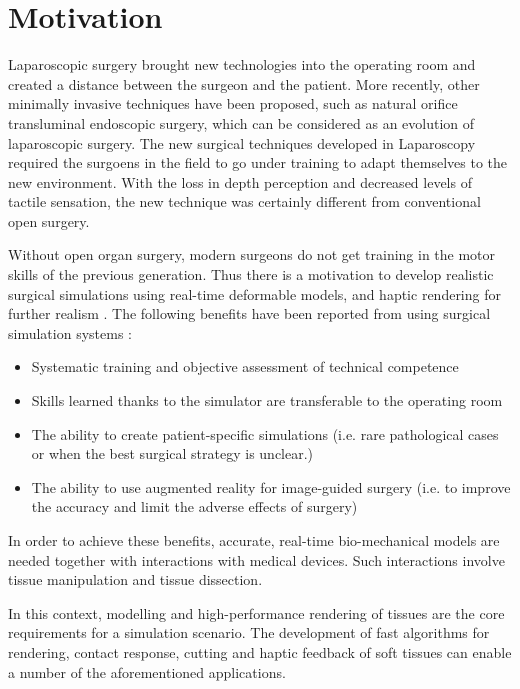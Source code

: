 \section{Motivation}

Laparoscopic surgery brought new technologies into the operating room and created a 
distance between the surgeon and the patient. More recently, other minimally invasive techniques have 
been proposed, such as natural orifice transluminal endoscopic surgery, which can be considered as an 
evolution of laparoscopic surgery. The new surgical techniques developed in Laparoscopy
required the surgoens in the field to go under training to adapt themselves to the new environment.
With the loss in depth perception and decreased levels of tactile sensation, the new technique was
certainly different from conventional open surgery.

Without open organ surgery, modern surgeons do not get training in the motor skills of the 
previous generation. Thus there is a motivation to develop realistic surgical simulations using 
real-time deformable models, and haptic rendering for further realism \cite{Lin2004}. 
The following benefits have been reported from using surgical simulation systems 
\cite{Liu2003, Basdogan2004}: 

\begin{itemize}
 \item Systematic training and objective assessment of technical competence
 \item Skills learned thanks to the simulator are transferable to the operating room
 \item The ability to create patient-specific simulations (i.e. rare pathological cases or when the best 
 surgical strategy is unclear.)
 \item The ability to use augmented reality for image-guided surgery (i.e. to improve the accuracy and 
 limit the adverse effects of surgery)
\end{itemize}

In order to achieve these benefits, accurate, real-time bio-mechanical models are needed together
with interactions with medical devices. Such interactions involve tissue manipulation and tissue dissection. 

In this context, modelling and high-performance rendering of tissues are the core requirements for 
a simulation scenario. The development of fast algorithms for rendering, contact response, 
cutting and haptic feedback of soft tissues can enable a number of the aforementioned applications.


